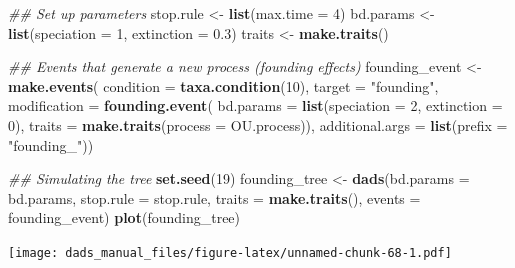 \documentclass[]{book}
\newenvironment{Shaded}{\begin{snugshade}}{\end{snugshade}}
\newcommand{\CommentTok}[1]{\textcolor[rgb]{0.56,0.35,0.01}{\textit{#1}}}
\newcommand{\DataTypeTok}[1]{\textcolor[rgb]{0.13,0.29,0.53}{#1}}
\newcommand{\DecValTok}[1]{\textcolor[rgb]{0.00,0.00,0.81}{#1}}
\newcommand{\FloatTok}[1]{\textcolor[rgb]{0.00,0.00,0.81}{#1}}
\newcommand{\KeywordTok}[1]{\textcolor[rgb]{0.13,0.29,0.53}{\textbf{#1}}}
\newcommand{\NormalTok}[1]{#1}
\newcommand{\StringTok}[1]{\textcolor[rgb]{0.31,0.60,0.02}{#1}}
\begin{document}
\begin{Shaded}
\begin{Highlighting}[]
\CommentTok{## Set up parameters}
\NormalTok{stop.rule <-}\StringTok{ }\KeywordTok{list}\NormalTok{(}\DataTypeTok{max.time =} \DecValTok{4}\NormalTok{)}
\NormalTok{bd.params <-}\StringTok{ }\KeywordTok{list}\NormalTok{(}\DataTypeTok{speciation =} \DecValTok{1}\NormalTok{, }\DataTypeTok{extinction =} \FloatTok{0.3}\NormalTok{)}
\NormalTok{traits    <-}\StringTok{ }\KeywordTok{make.traits}\NormalTok{()}

\CommentTok{## Events that generate a new process (founding effects)}
\NormalTok{founding_event <-}\StringTok{ }\KeywordTok{make.events}\NormalTok{(}
                  \DataTypeTok{condition    =} \KeywordTok{taxa.condition}\NormalTok{(}\DecValTok{10}\NormalTok{),}
                  \DataTypeTok{target       =} \StringTok{"founding"}\NormalTok{,}
                  \DataTypeTok{modification =} \KeywordTok{founding.event}\NormalTok{(}
                                    \DataTypeTok{bd.params =} \KeywordTok{list}\NormalTok{(}\DataTypeTok{speciation =} \DecValTok{2}\NormalTok{,}
                                                     \DataTypeTok{extinction =} \DecValTok{0}\NormalTok{),}
                                    \DataTypeTok{traits =} \KeywordTok{make.traits}\NormalTok{(}\DataTypeTok{process =}\NormalTok{ OU.process)),}
                  \DataTypeTok{additional.args =} \KeywordTok{list}\NormalTok{(}\DataTypeTok{prefix =} \StringTok{"founding_"}\NormalTok{))}

\CommentTok{## Simulating the tree}
\KeywordTok{set.seed}\NormalTok{(}\DecValTok{19}\NormalTok{)}
\NormalTok{founding_tree <-}\StringTok{ }\KeywordTok{dads}\NormalTok{(}\DataTypeTok{bd.params =}\NormalTok{ bd.params,}
                      \DataTypeTok{stop.rule =}\NormalTok{ stop.rule,}
                      \DataTypeTok{traits    =} \KeywordTok{make.traits}\NormalTok{(),}
                      \DataTypeTok{events    =}\NormalTok{ founding_event)}
\KeywordTok{plot}\NormalTok{(founding_tree)}
\end{Highlighting}
\end{Shaded}

\texttt{[image: dads\_manual\_files/figure-latex/unnamed-chunk-68-1.pdf]}


\end{document}
